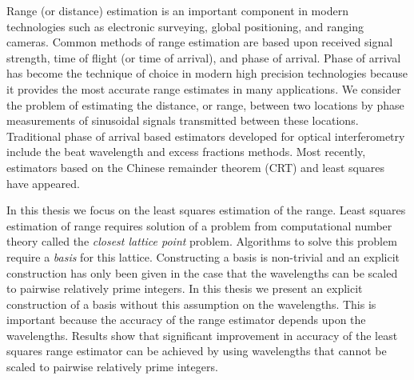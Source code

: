 % 

Range (or distance) estimation is an important component in modern technologies such as electronic surveying, global positioning, and ranging cameras. Common methods of range estimation are based upon received signal strength, time of flight (or time of arrival), and phase of arrival. Phase of arrival has become the technique of choice in modern high precision technologies because it provides the most accurate range estimates in many applications. We consider the problem of estimating the distance, or range, between two locations by phase measurements of sinusoidal signals transmitted between these locations. Traditional phase of arrival based estimators developed for optical interferometry include the beat wavelength and excess fractions methods. Most recently, estimators based on the Chinese remainder theorem (CRT) and least squares have appeared.

In this thesis we focus on the least squares estimation of the range. Least squares estimation of range requires solution of a problem from computational number theory called the \emph{closest lattice point} problem. Algorithms to solve this problem require a \emph{basis} for this lattice. Constructing a basis is non-trivial and an explicit construction has only been given in the case that the wavelengths can be scaled to pairwise relatively prime integers. In this thesis we present an explicit construction of a basis without this assumption on the wavelengths. This is important because the accuracy of the range estimator depends upon the wavelengths. Results show that significant improvement in accuracy of the least squares range estimator can be achieved by using wavelengths that cannot be scaled to pairwise relatively prime integers. 

